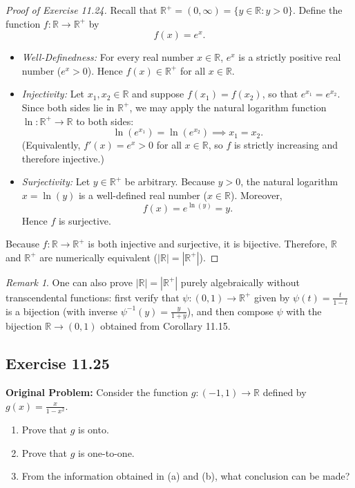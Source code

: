 \documentclass[11pt, letterpaper]{article}
\theoremstyle{definition}
\theoremstyle{remark}
\newtheorem{remark}{Remark}[section]
\begin{document}
\begin{proof}[Proof of Exercise 11.24]
Recall that $\mathbb{R}^+ = (0, \infty) = \{y \in \mathbb{R} : y > 0\}$. Define the function $f : \mathbb{R} \to \mathbb{R}^+$ by
\[
f(x) = e^x.
\]
\begin{itemize}
    \item \emph{Well-Definedness:} For every real number $x \in \mathbb{R}$, $e^x$ is a strictly positive real number ($e^x > 0$). Hence $f(x) \in \mathbb{R}^+$ for all $x \in \mathbb{R}$.
    \item \emph{Injectivity:} Let $x_1, x_2 \in \mathbb{R}$ and suppose $f(x_1) = f(x_2)$, so that $e^{x_1} = e^{x_2}$. Since both sides lie in $\mathbb{R}^+$, we may apply the natural logarithm function $\ln : \mathbb{R}^+ \to \mathbb{R}$ to both sides:
    \[
    \ln\left(e^{x_1}\right) = \ln\left(e^{x_2}\right) \implies x_1 = x_2.
    \]
    (Equivalently, $f'(x) = e^x > 0$ for all $x \in \mathbb{R}$, so $f$ is strictly increasing and therefore injective.)
    \item \emph{Surjectivity:} Let $y \in \mathbb{R}^+$ be arbitrary. Because $y > 0$, the natural logarithm $x = \ln(y)$ is a well-defined real number ($x \in \mathbb{R}$). Moreover,
    \[
    f(x) = e^{\ln(y)} = y.
    \]
    Hence $f$ is surjective.
\end{itemize}
Because $f : \mathbb{R} \to \mathbb{R}^+$ is both injective and surjective, it is bijective. Therefore, $\mathbb{R}$ and $\mathbb{R}^+$ are numerically equivalent ($|\mathbb{R}| = |\mathbb{R}^+|$).
\end{proof}

\begin{remark}
One can also prove $|\mathbb{R}| = |\mathbb{R}^+|$ purely algebraically without transcendental functions: first verify that $\psi : (0, 1) \to \mathbb{R}^+$ given by $\psi(t) = \frac{t}{1 - t}$ is a bijection (with inverse $\psi^{-1}(y) = \frac{y}{1 + y}$), and then compose $\psi$ with the bijection $\mathbb{R} \to (0, 1)$ obtained from Corollary 11.15.
\end{remark}

\subsection{Exercise 11.25}

\textbf{Original Problem:} Consider the function $g : (-1, 1) \to \mathbb{R}$ defined by $g(x) = \frac{x}{1 - x^2}$.
\begin{enumerate}[label=(\alph*)]
    \item Prove that $g$ is onto.
    \item Prove that $g$ is one-to-one.
    \item From the information obtained in (a) and (b), what conclusion can be made?
\end{enumerate}
\end{document}
